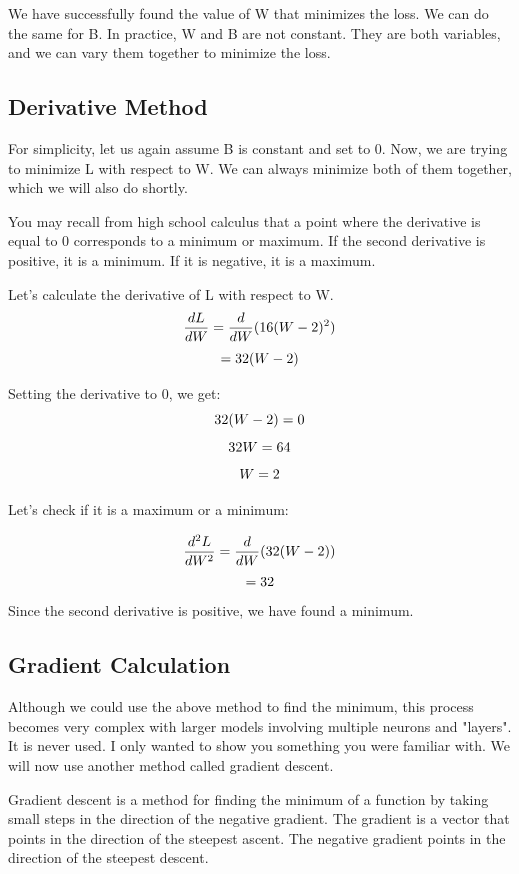 \documentclass[12pt,a4paper]{article}
\begin{document}
We have successfully found the value of W that minimizes the loss. We can do the same for B. In practice, W and B are not constant. They are both variables, and we can vary them together to minimize the loss.

\subsection{Derivative Method}
For simplicity, let us again assume B is constant and set to 0. Now, we are trying to minimize L with respect to W. We can always minimize both of them together, which we will also do shortly.

You may recall from high school calculus that a point where the derivative is equal to 0 corresponds to a minimum or maximum. If the second derivative is positive, it is a minimum. If it is negative, it is a maximum.

Let's calculate the derivative of L with respect to W.
\[
\frac{dL}{dW} = \frac{d}{dW}(16(W-2)^2) \\
\]
\[
= 32(W-2) \\
\]

Setting the derivative to 0, we get:
\[
32(W-2) = 0 \\
\]
\[
32W = 64 \\
\]
\[
W=2 \\
\]

Let's check if it is a maximum or a minimum:

\[
\frac{d^2L}{dW^2} = \frac{d}{dW}(32(W-2)) \\
\]
\[
= 32 \\
\]
Since the second derivative is positive, we have found a minimum.

\subsection{Gradient Calculation}
Although we could use the above method to find the minimum, this process becomes very complex with larger models involving multiple neurons and "layers". It is never used. I only wanted to show you something you were familiar with. We will now use another method called gradient descent.

Gradient descent is a method for finding the minimum of a function by taking small steps in the direction of the negative gradient. The gradient is a vector that points in the direction of the steepest ascent. The negative gradient points in the direction of the steepest descent.
\end{document}
